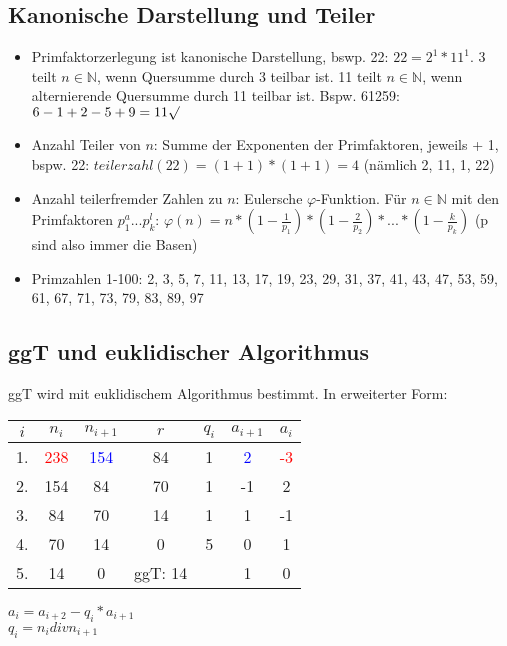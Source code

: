 \documentclass[12pt,landscape]{article}
\begin{document}
\begin{multicols}{3}
\subsection{Kanonische Darstellung und Teiler}
\begin{itemize}
\item Primfaktorzerlegung ist kanonische Darstellung, bswp. 22: $22 = 2^1 * 11^1$. 3 teilt $n \in \mathbb{N}$, wenn Quersumme durch 3 teilbar ist. 11 teilt $n \in \mathbb{N}$, wenn alternierende Quersumme durch 11 teilbar ist. Bspw. 61259: $6 - 1 + 2 - 5 + 9 = 11 \surd$
\item Anzahl Teiler von $n$: Summe der Exponenten der Primfaktoren, jeweils + 1, bspw. 22: $teilerzahl(22) = (1+1)*(1+1) = 4$ (nämlich 2, 11, 1, 22)
\item Anzahl teilerfremder Zahlen zu $n$: Eulersche $\varphi$-Funktion. Für $n \in \mathbb{N}$ mit den Primfaktoren $p_1^a ... p_k^l$: $\varphi(n)=n*(1-\frac{1}{p_1})*(1-\frac{2}{p_2})*...*(1-\frac{k}{p_k})$ (p sind also immer die Basen)
\item Primzahlen 1-100: 2, 3, 5, 7, 11, 13, 17, 19, 23, 29, 31, 37, 41, 43, 47, 53, 59, 61, 67, 71, 73, 79, 83, 89, 97
\end{itemize}
\subsection{ggT und euklidischer Algorithmus}
ggT wird mit euklidischem Algorithmus bestimmt. In erweiterter Form:
\vspace*{0.5cm}\newline
\begin{tabular}{|c|c|c|c|c|c|c|}
\hline \rule[-2ex]{0pt}{5.5ex} $i$ & $n_i$ & $n_{i+1}$ &  $r$ & $q_i$ & $a_{i+1}$ & $a{_i}$ \\ 
\hline \rule[-2ex]{0pt}{5.5ex} 1. & \textcolor{red}{238} & \textcolor{blue}{154} & 84 & 1 & \textcolor{blue}{2} & \textcolor{red}{-3} \\ 
\hline \rule[-2ex]{0pt}{5.5ex} 2. & 154 &  84 & 70 & 1 & -1 & 2 \\ 
\hline \rule[-2ex]{0pt}{5.5ex} 3. & 84 & 70 & 14 & 1 & 1 & -1 \\ 
\hline \rule[-2ex]{0pt}{5.5ex} 4. & 70 & 14 & 0 & 5 & 0 & 1 \\ 
\hline \rule[-2ex]{0pt}{5.5ex} 5. & 14 & 0 & ggT: 14 &  & 1 & 0 \\ 
\hline 
\end{tabular}
\vspace{0.5cm}\newline
$a_i = a_{i+2} - q_i * a_{i+1}$\\
$q_i = n_i div n_{i+1}$

\end{multicols}
\end{document}
